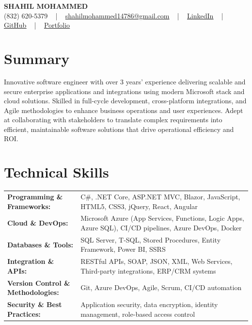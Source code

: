 \documentclass[letterpaper,11pt]{article}
\begin{document}
\begin{center}
    {\fontsize{14pt}{12pt}\selectfont \textbf{\MakeUppercase{Shahil Mohammed}}}\\ \vspace{2pt}
    \fontsize{10pt}{12pt}\selectfont (832) 620-5379 ~ | ~ \href{mailto:shahilmohammed14786@gmail.com}{shahilmohammed14786@gmail.com} ~ | ~  
    \href{https://www.linkedin.com/in/shahil-mohammed-9652931a1/}{\color{blue}\underline{LinkedIn}}  ~ | ~ 
    \href{https://github.com/freakbeast14}{\color{blue}\underline{GitHub}} ~ | ~ 
    \href{https://shahil-mohammed.netlify.app/}{\color{blue}\underline{Portfolio}}
    \vspace{-8pt}
\end{center}

\section{Summary}
\fontsize{9pt}{10pt}\selectfont
Innovative software engineer with over 3 years’ experience delivering scalable and secure enterprise applications and integrations using modern Microsoft stack and cloud solutions. Skilled in full-cycle development, cross-platform integrations, and Agile methodologies to enhance business operations and user experiences. Adept at collaborating with stakeholders to translate complex requirements into efficient, maintainable software solutions that drive operational efficiency and ROI.
 \vspace{-5pt}
 
\section{Technical Skills}
        \vspace{-14pt}
        \begin{table}[h]
            \fontsize{9pt}{10pt}\selectfont
            \begin{tabular}{p{0.3\linewidth} p{0.7\linewidth}}
                \textbf{Programming \& Frameworks:} & C\#, .NET Core, ASP.NET MVC, Blazor, JavaScript, HTML5, CSS3, jQuery, React, Angular \\
                \textbf{Cloud \& DevOps:} & Microsoft Azure (App Services, Functions, Logic Apps, Azure SQL), CI/CD pipelines, Azure DevOps, Docker \\
                \textbf{Databases \& Tools:} & SQL Server, T-SQL, Stored Procedures, Entity Framework, Power BI, SSRS \\
                \textbf{Integration \& APIs:} & RESTful APIs, SOAP, JSON, XML, Web Services, Third-party integrations, ERP/CRM systems \\
                \textbf{Version Control \& Methodologies:} & Git, Azure DevOps, Agile, Scrum, CI/CD automation \\
                \textbf{Security \& Best Practices:} & Application security, data encryption, identity management, role-based access control \\
            \end{tabular}
        \end{table}
 \vspace{-15pt}
 
\end{document}

